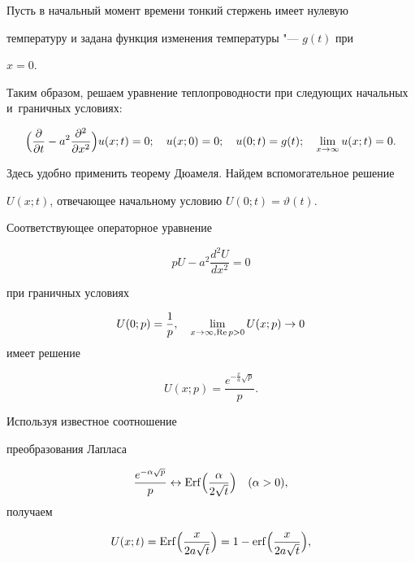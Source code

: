 Пусть в начальный момент времени тонкий стержень имеет нулевую 

температуру и задана функция изменения температуры "--- $g(t)$ при 

$x=0$. 

Таким образом, решаем  уравнение теплопроводности при  следующих начальных и~граничных условиях: 

\begin{equation}

\label{kogan:eq39}

\Bigl(\frac{\partial }{\partial t}-a^2\frac{\partial ^2}{\partial x^2} 

\Bigr)u(x;t)=0;

\quad

u(x;0)=0;

\quad

u(0;t)=g(t);

\quad

\lim \limits_{x\to \infty } u(x;t)=0.

\end{equation}



Здесь удобно применить теорему Дюамеля. Найдем вспомогательное решение 

$U(x;t)$, отвечающее начальному условию $U(0;t)=\vartheta (t)$. 

Соответствующее операторное уравнение 

$$pU-a^2\frac{d^2U}{dx^2}=0$$

при граничных условиях 

$$U (0;p)= \frac 1 p,  \quad \lim \limits_{x\to \infty, \mathop{\rm Re} p>0} U(x;p)\to 

0$$ имеет решение 

$$U(x;p)=\frac{e^{-\frac{x}{a}\sqrt p }}{p}.$$ 

Используя известное соотношение 

преобразования Лапласа~\cite{kogan:bib3} 

$$\frac{e^{-\alpha \sqrt p}}{p}\leftrightarrow 

{\rm Erf}\Big( \frac{\alpha} { 2\sqrt t} \Bigr)\quad  (\alpha >0),$$ получаем 

\begin{equation}

\label{kojgan:eq40}

U(x;t)={\rm Erf}\Bigl(\frac x {2a\sqrt t} \Bigr)=1-\mathop{\rm erf} \Bigl(\frac x {2a\sqrt t} \Bigr),

\end{equation}

